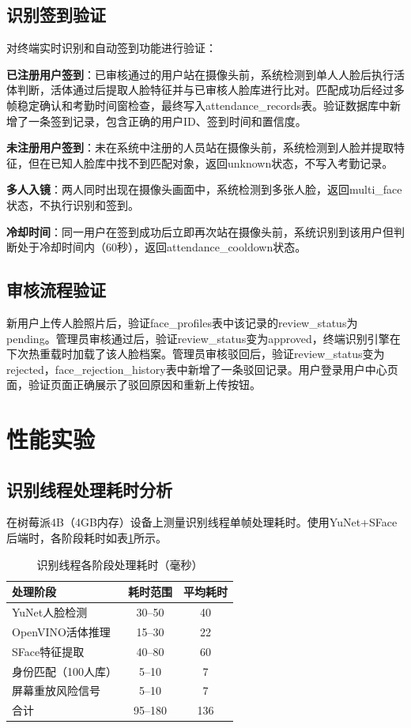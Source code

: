 \subsection{识别签到验证}

对终端实时识别和自动签到功能进行验证：

\textbf{已注册用户签到}：已审核通过的用户站在摄像头前，系统检测到单人人脸后执行活体判断，活体通过后提取人脸特征并与已审核人脸库进行比对。匹配成功后经过多帧稳定确认和考勤时间窗检查，最终写入attendance\_records表。验证数据库中新增了一条签到记录，包含正确的用户ID、签到时间和置信度。

\textbf{未注册用户签到}：未在系统中注册的人员站在摄像头前，系统检测到人脸并提取特征，但在已知人脸库中找不到匹配对象，返回unknown状态，不写入考勤记录。

\textbf{多人入镜}：两人同时出现在摄像头画面中，系统检测到多张人脸，返回multi\_face状态，不执行识别和签到。

\textbf{冷却时间}：同一用户在签到成功后立即再次站在摄像头前，系统识别到该用户但判断处于冷却时间内（60秒），返回attendance\_cooldown状态。

\subsection{审核流程验证}

新用户上传人脸照片后，验证face\_profiles表中该记录的review\_status为pending。管理员审核通过后，验证review\_status变为approved，终端识别引擎在下次热重载时加载了该人脸档案。管理员审核驳回后，验证review\_status变为rejected，face\_rejection\_history表中新增了一条驳回记录。用户登录用户中心页面，验证页面正确展示了驳回原因和重新上传按钮。

\section{性能实验}

\subsection{识别线程处理耗时分析}

在树莓派4B（4GB内存）设备上测量识别线程单帧处理耗时。使用YuNet+SFace后端时，各阶段耗时如表\ref{tab:timing}所示。

\begin{table}[htbp]
    \centering
    \caption{识别线程各阶段处理耗时（毫秒）}
    \label{tab:timing}
    \begin{tabular}{lcc}
        \toprule
        \textbf{处理阶段} & \textbf{耗时范围} & \textbf{平均耗时} \\
        \midrule
        YuNet人脸检测 & 30--50 & 40 \\
        OpenVINO活体推理 & 15--30 & 22 \\
        SFace特征提取 & 40--80 & 60 \\
        身份匹配（100人库） & 5--10 & 7 \\
        屏幕重放风险信号 & 5--10 & 7 \\
        \midrule
        合计 & 95--180 & 136 \\
        \bottomrule
    \end{tabular}
\end{table}


